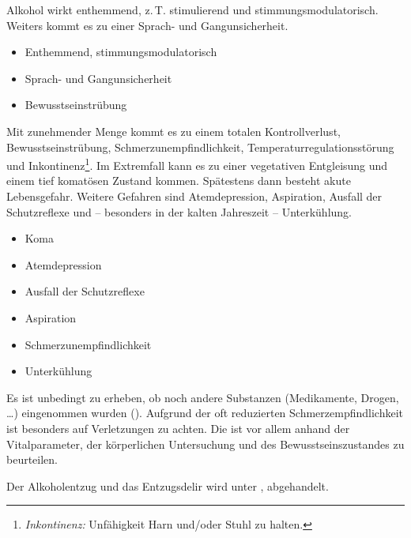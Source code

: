 
{%
Alkohol  wirkt enthemmend, z.\,T. stimulierend und
stimmungsmodulatorisch. Weiters kommt es zu einer Sprach- 
und Gangunsicherheit. 

\bigskip

\bigskip

}{%
\begin{itemize}
    \item Enthemmend, stimmungsmodulatorisch
    \item Sprach- und Gangunsicherheit
    \item Bewusstseinstrübung
\end{itemize}
}{}{}{}

{%
Mit zunehmender Menge kommt es zu einem totalen
Kontrollverlust, Bewusstseinstrübung,
Schmerzunempfindlichkeit, Temperaturregulationsstörung und
Inkontinenz\footnote{\emph{Inkontinenz:} Unfähigkeit Harn
und/oder Stuhl zu halten.}. Im Extremfall kann es zu einer 
vegetativen Entgleisung und einem tief komatösen Zustand 
kommen. Spätestens dann besteht akute Lebensgefahr. Weitere 
Gefahren sind Atemdepression, Aspiration, Ausfall der 
Schutzreflexe und -- besonders in der kalten Jahreszeit --
Unterkühlung.
}{%
\begin{itemize}
    \item Koma
    \item Atemdepression
    \item  Ausfall der Schutzreflexe
    \item Aspiration
    \item Schmerzunempfindlichkeit
    \item Unterkühlung
\end{itemize}
}{}{}{}


Es ist unbedingt zu erheben, ob noch andere Substanzen
(Medikamente, Drogen, \ldots) eingenommen wurden
(). Aufgrund der oft reduzierten
Schmerzempfindlichkeit ist besonders auf Verletzungen zu
achten.
Die  ist vor allem anhand der
Vitalparameter, der körperlichen Untersuchung und des
Bewusstseinszustandes zu beurteilen. 

Der Alkoholentzug und das Entzugsdelir wird unter
, abgehandelt.



